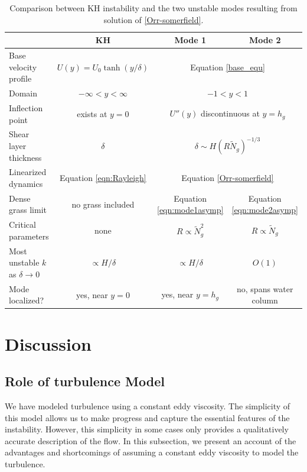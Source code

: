 \documentclass[12pt]{report}   %
\newcommand{\hg}{h_g}
\newcommand{\Rey}{{R}}
\newcommand{\Ndg}{\tilde{N}_g}
\begin{document}
%
\begin{table}
{}  %
\renewcommand{\arraystretch}{1.2}
 \begin{tabular}{l|c|c|c}
			& KH 				& Mode 1 		& Mode 2 \\ \hline
 Base velocity profile 	& $U(y) = U_0 \tanh(y/\delta)$			& \multicolumn{2}{c}{Equation \eqref{base_equ}} \\
 Domain 		& $-\infty < y < \infty$			& \multicolumn{2}{c}{$-1<y<1$} \\
 Inflection point	& exists at $y=0$				& \multicolumn{2}{c}{$U''(y)$ discontinuous at $y=\hg$} \\
 Shear layer thickness	& $\delta$					& \multicolumn{2}{c}{$\delta \sim  H\left(\Rey \Ndg \right)^{-1/3}$} \\
 Linearized dynamics	& Equation \eqref{eqn:Rayleigh}		& \multicolumn{2}{c}{Equation \eqref{Orr-somerfield}} \\
 Dense grass limit &  no grass included & Equation \eqref{eqn:mode1asymp} & Equation \eqref{eqn:mode2asymp}  \\
 Critical parameters	& none						& $\Rey \propto \Ndg^{2}$ 	& $\Rey \propto \Ndg$ \\
 Most unstable $k$ as $\delta \to 0$	& $\propto H/\delta$		& $\propto H/\delta$	& $O(1)$ \\
 Mode localized?	& yes, near $y=0$				& yes, near $y=\hg$			& no, spans water column
 \end{tabular}
 \caption{Comparison between KH instability and the two unstable modes resulting from solution of \ref{Orr-somerfield}.}
 \label{tab:comparison}
\end{table}
\clearpage{\pagestyle{empty}\cleardoublepage}

\chapter{Discussion}
\section{Role of turbulence Model}
We have modeled turbulence using a constant eddy viscosity. 
The simplicity of this model allows us to make progress and capture the essential features of the instability. 
However, this simplicity in some cases only provides a qualitatively accurate description of the flow. 
In this subsection, we present an account of the advantages and shortcomings of assuming a constant eddy viscosity to model the turbulence.
\end{document}
